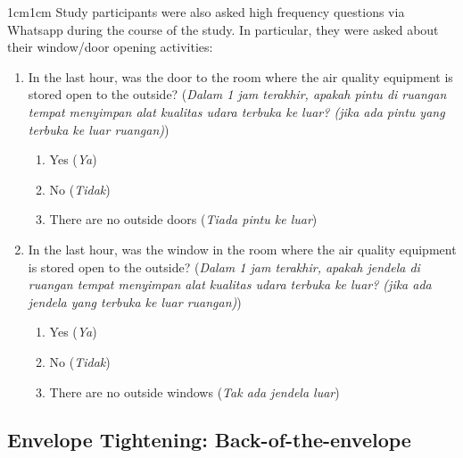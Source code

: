 \documentclass[9pt,twoside]{pnas-new}
\begin{document}
\begin{adjustwidth}{1cm}{1cm}
Study participants were also asked high frequency questions via Whatsapp during the course of the study. In particular, they were asked about their window/door opening activities:
\begin{enumerate}
    \item In the last hour, was the door to the room where the air quality equipment is stored open to the outside? (\textit{Dalam 1 jam terakhir, apakah pintu di ruangan tempat menyimpan alat kualitas udara terbuka ke luar? (jika ada pintu yang terbuka ke luar ruangan)})
    \begin{enumerate}
        \item Yes (\textit{Ya})
        \item No (\textit{Tidak})
        \item There are no outside doors (\textit{Tiada pintu ke luar})
    \end{enumerate}
        \item In the last hour, was the window in the room where the air quality equipment is stored open to the outside? (\textit{Dalam 1 jam terakhir, apakah jendela di ruangan tempat menyimpan alat kualitas udara terbuka ke luar? (jika ada jendela yang terbuka ke luar ruangan)})
    \begin{enumerate}
        \item Yes (\textit{Ya})
        \item No (\textit{Tidak})
        \item There are no outside windows (\textit{Tak ada jendela luar})
    \end{enumerate}
\end{enumerate}

\clearpage

\newpage
\pagebreak 
\subsection*{Envelope Tightening: Back-of-the-envelope} %


\end{adjustwidth}
\end{document}
